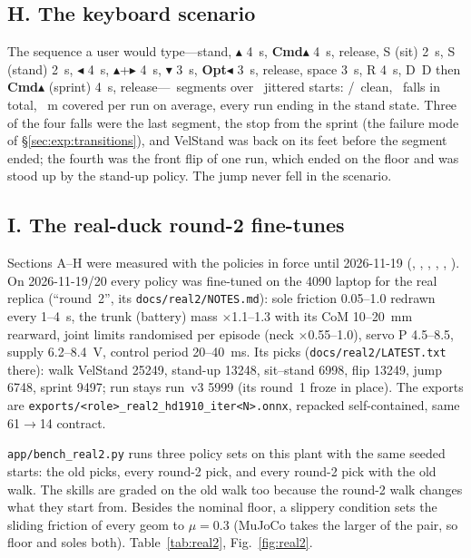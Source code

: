 \documentclass[11pt]{article}
\newcommand{\code}[1]{\texttt{\small #1}}
\newcommand{\fig}[1]{Fig.~\ref{fig:#1}}
\newcommand{\tab}[1]{Table~\ref{tab:#1}}
\newcommand{\cmdkey}{\textsf{\textbf{Cmd}}}      %
\newcommand{\optkey}{\textsf{\textbf{Opt}}}      %
\begin{document}
\subsection{H. The keyboard scenario}\label{sec:exp:seq}
The sequence a user would type---stand, $\blacktriangle$ 4~s, \cmdkey$\blacktriangle$ 4~s, release, S (sit)
2~s, S (stand) 2~s, $\blacktriangleleft$ 4~s, $\blacktriangle$+$\blacktriangleright$ 4~s, $\blacktriangledown$ 3~s,
\optkey$\blacktriangleleft$ 3~s, release, space 3~s, R 4~s, D~D then \cmdkey$\blacktriangle$ (sprint) 4~s,
release---\seqSegments~segments over \seqTrials~jittered starts: \seqClean/\seqTrials~clean, \seqFalls~falls in
total, \seqDist~m covered per run on average, every run ending in the stand state. Three of the four falls were
the last segment, the stop from the sprint (the failure mode of \S\ref{sec:exp:transitions}), and VelStand was
back on its feet before the segment ended; the fourth was the front flip of one run, which ended on the floor and
was stood up by the stand-up policy. The jump never fell in the scenario.

\subsection{I. The real-duck round-2 fine-tunes}\label{sec:exp:real2}
Sections A--H were measured with the policies in force until 2026-11-19 (\code{\polWalk}, \code{\polSprint},
\code{\polSitstand}, \code{\polJump}, \code{\polRoulade}, \code{\polRecovery}). On 2026-11-19/20 every policy was
fine-tuned on the 4090 laptop for the real replica (``round~2'', its \code{docs/real2/NOTES.md}): sole friction
0.05--1.0 redrawn every 1--4~s, the trunk (battery) mass $\times$1.1--1.3 with its CoM 10--20~mm rearward, joint
limits randomised per episode (neck $\times$0.55--1.0), servo P 4.5--8.5, supply 6.2--8.4~V, control period
20--40~ms. Its picks (\code{docs/real2/LATEST.txt} there): walk VelStand 25249, stand-up 13248, sit--stand 6998,
flip 13249, jump 6748, sprint 9497; run stays run~v3 5999 (its round~1 froze in place). The exports are
\code{exports/<role>\_real2\_hd1910\_iter<N>.onnx}, repacked self-contained, same 61$\to$14 contract.

\code{app/bench\_real2.py} runs three policy sets on this plant with the same seeded starts: the old picks, every
round-2 pick, and every round-2 pick with the old walk. The skills are graded on the old walk too because the
round-2 walk changes what they start from. Besides the nominal floor, a slippery condition sets the sliding friction of every geom to
$\mu=0.3$ (MuJoCo takes the larger of the pair, so floor and soles both). \tab{real2}, \fig{real2}.
\end{document}
